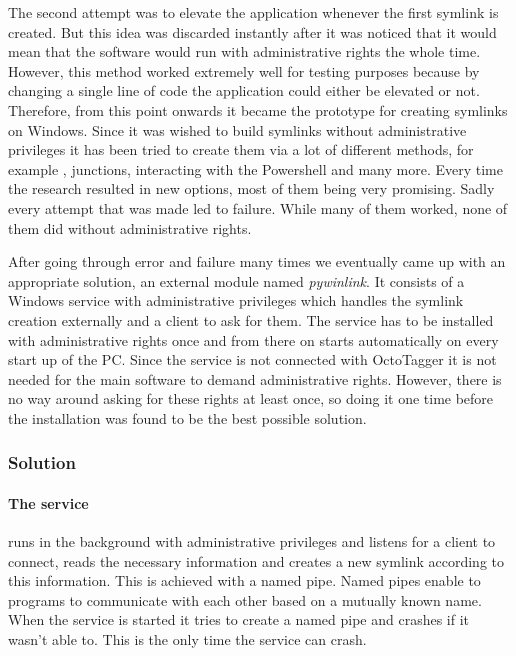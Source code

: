 The second attempt was to elevate the application whenever the first symlink is created. But this idea was discarded instantly after it was noticed that it would mean that the software would run with administrative rights the whole time. However, this method worked extremely well for testing purposes because by changing a single line of code the application could either be elevated or not. Therefore, from this point onwards it became the prototype for creating symlinks on Windows.
Since it was wished to build symlinks without administrative privileges it has been tried to create them via a lot of different methods, for example , junctions, interacting with the Powershell and many more. Every time the research resulted in new options, most of them being very promising. Sadly every attempt that was made led to failure. While many of them worked, none of them did without administrative rights.
 
After going through error and failure many times we eventually came up with an appropriate solution, an external module named \textit{pywinlink}. It consists of a Windows service with administrative privileges which handles the symlink creation externally and a client to ask for them. The service has to be installed with administrative rights once and from there on starts automatically on every start up of the PC. Since the service is not connected with OctoTagger it is not needed for the main software to demand administrative rights. However, there is no way around asking for these rights at least once, so doing it one time before the installation was found to be the best possible solution. 

\subsubsection{Solution} %

\paragraph{The service} runs in the background with administrative privileges
and listens for a client to connect, reads the necessary information and
creates a new symlink according to this information. This is achieved with a
named pipe. Named pipes enable to programs to communicate with each other based
on a mutually known name. When the service is started it tries to create a
named pipe and crashes if it wasn't able to. This is the only time the service
can crash.

